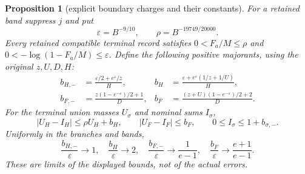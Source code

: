 \documentclass[11pt]{article}
\newtheorem{proposition}{Proposition}
\theoremstyle{remark}\newtheorem{remark}[proposition]{Remark}
\begin{document}
\begin{proposition}[explicit boundary charges and their constants]
\label{prop:mazur-genuine-boundaries}
For a retained band suppress $j$ and put
\[
 \varepsilon=B^{-9/10},\qquad \rho=B^{-19749/20000}.
\]
Every retained compatible terminal record satisfies
$0<F_a/M\le\rho$ and $0<-\log(1-F_a/M)\le\varepsilon$.
Define the following positive \emph{majorants}, using the original
$z,U,D,H$:
\begin{align*}
 b_{H,-}&=\frac{\varepsilon/2+e^\varepsilon/z}{H},&
 b_H&=\frac{\varepsilon+e^\varepsilon(1/z+1/U)}H,\\
 b_{F,-}&=\frac{z(1-e^{-\varepsilon})/2+1}{D},&
 b_F&=\frac{(z+U)(1-e^{-\varepsilon})/2+2}{D}.
\end{align*}
For the terminal union masses $U_\sigma$ and nominal sums $I_\sigma$,
\begin{equation}
 |U_H-I_H|\le\rho U_H+b_H,\qquad
 |U_F-I_F|\le b_F,\qquad
 0\le I_\sigma\le1+b_{\sigma,-}.
 \label{eq:mazur-explicit-boundaries}
\end{equation}
Uniformly in the branches and bands,
\[
 \frac{b_{H,-}}{\varepsilon}\longrightarrow1,\quad
 \frac{b_H}{\varepsilon}\longrightarrow2,\quad
 \frac{b_{F,-}}{\varepsilon}\longrightarrow\frac1{e-1},\quad
 \frac{b_F}{\varepsilon}\longrightarrow\frac{e+1}{e-1}.
\]
These are limits of the displayed bounds, not of the actual errors.
\end{proposition}
\end{document}
